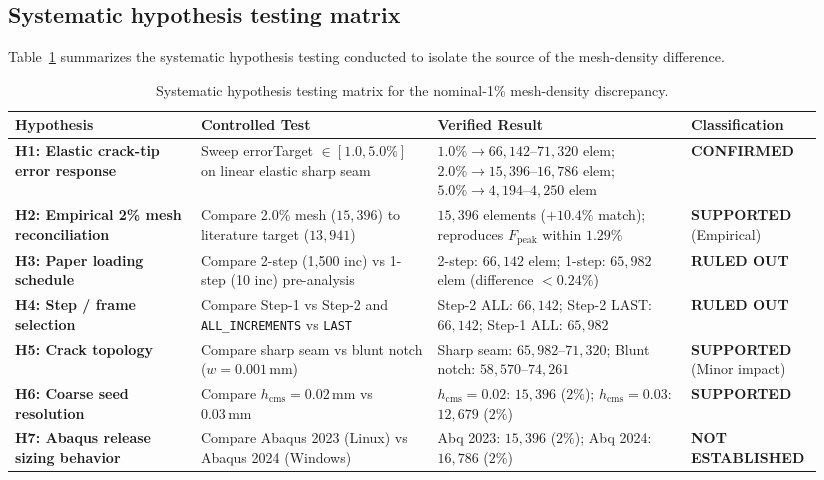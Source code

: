 \subsection{Systematic hypothesis testing matrix}
Table~\ref{tab:hypothesis_matrix} summarizes the systematic hypothesis testing conducted to isolate the source of the mesh-density difference.

\begin{table}[htbp]
\centering
\caption{Systematic hypothesis testing matrix for the nominal-1\% mesh-density discrepancy.}
\label{tab:hypothesis_matrix}
\footnotesize
\begin{tabularx}{\linewidth}{p{0.22\linewidth}p{0.28\linewidth}p{0.30\linewidth}p{0.14\linewidth}}
\toprule
\textbf{Hypothesis} & \textbf{Controlled Test} & \textbf{Verified Result} & \textbf{Classification} \\
\midrule
\textbf{H1: Elastic crack-tip error response} & Sweep errorTarget $\in [1.0, 5.0\%]$ on linear elastic sharp seam & $1.0\% \to 66{,}142\text{--}71{,}320$ elem; $2.0\% \to 15{,}396\text{--}16{,}786$ elem; $5.0\% \to 4{,}194\text{--}4{,}250$ elem & \textbf{CONFIRMED} \\
\textbf{H2: Empirical 2\% mesh reconciliation} & Compare 2.0\% mesh ($15{,}396$) to literature target ($13{,}941$) & $15{,}396$ elements ($+10.4\%$ match); reproduces $F_{\text{peak}}$ within $1.29\%$ & \textbf{SUPPORTED} (Empirical) \\
\textbf{H3: Paper loading schedule} & Compare 2-step (1,500 inc) vs 1-step (10 inc) pre-analysis & 2-step: $66{,}142$ elem; 1-step: $65{,}982$ elem (difference $<0.24\%$) & \textbf{RULED OUT} \\
\textbf{H4: Step / frame selection} & Compare Step-1 vs Step-2 and \texttt{ALL\_INCREMENTS} vs \texttt{LAST} & Step-2 ALL: $66{,}142$; Step-2 LAST: $66{,}142$; Step-1 ALL: $65{,}982$ & \textbf{RULED OUT} \\
\textbf{H5: Crack topology} & Compare sharp seam vs blunt notch ($w=0.001\,\mathrm{mm}$) & Sharp seam: $65{,}982\text{--}71{,}320$; Blunt notch: $58{,}570\text{--}74{,}261$ & \textbf{SUPPORTED} (Minor impact) \\
\textbf{H6: Coarse seed resolution} & Compare $h_{\mathrm{cms}} = 0.02\,\mathrm{mm}$ vs $0.03\,\mathrm{mm}$ & $h_{\mathrm{cms}}=0.02$: $15{,}396$ ($2\%$); $h_{\mathrm{cms}}=0.03$: $12{,}679$ ($2\%$) & \textbf{SUPPORTED} \\
\textbf{H7: Abaqus release sizing behavior} & Compare Abaqus 2023 (Linux) vs Abaqus 2024 (Windows) & Abq 2023: $15{,}396$ ($2\%$); Abq 2024: $16{,}786$ ($2\%$) & \textbf{NOT ESTABLISHED} \\
\bottomrule
\end{tabularx}
\end{table}

